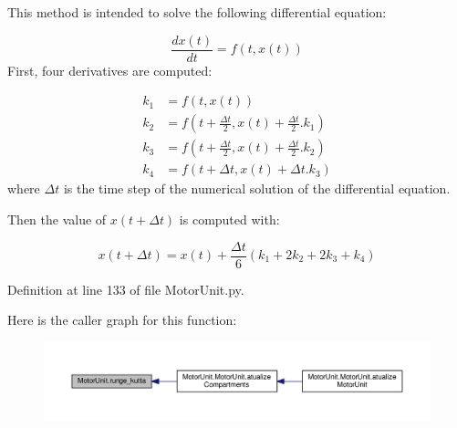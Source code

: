 This method is intended to solve the following differential equation\+:

\begin{equation} \frac{dx(t)}{dt} = f(t, x(t)) \end{equation} First, four derivatives are computed\+:

\begin{align} k_1 &= f(t,x(t))\\ k_2 &= f(t+\frac{\Delta t}{2}, x(t) + \frac{\Delta t}{2}.k_1)\\ k_3 &= f(t+\frac{\Delta t}{2}, x(t) + \frac{\Delta t}{2}.k_2)\\ k_4 &= f(t+\Delta t, x(t) + \Delta t.k_3) \end{align} where $\Delta t$ is the time step of the numerical solution of the differential equation.

Then the value of $x(t+\Delta t)$ is computed with\+:

\begin{equation} x(t+\Delta t) = x(t) + \frac{\Delta t}{6}(k_1 + 2k_2 + 2k_3+k_4) \end{equation} 

Definition at line 133 of file Motor\+Unit.\+py.



Here is the caller graph for this function\+:\nopagebreak
\begin{figure}[H]
\begin{center}
\leavevmode
\includegraphics[width=350pt]{namespace_motor_unit_ab7df982e859623662808361f779572f5_icgraph}
\end{center}
\end{figure}



